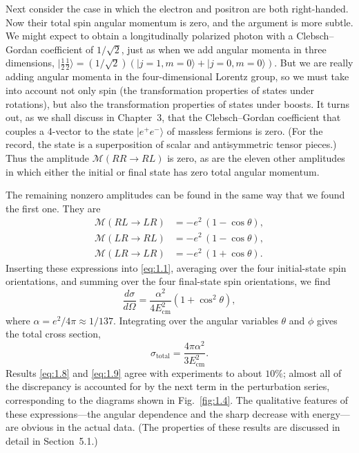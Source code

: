 Next consider the case in which the electron and positron are both
right-handed.  Now their total spin angular momentum is zero, and the
argument is more subtle.  We might expect to obtain a longitudinally
polarized photon with a Clebsch--Gordan coefficient of $1/\sqrt{2}$, just
as when we add angular momenta in three dimensions,
$|\tfrac{1}{2}\tfrac{1}{2}\rangle =
(1/\sqrt{2})(|j{=}1, m{=}0\rangle + |j{=}0, m{=}0\rangle)$.  But we are
really adding angular momenta in the four-dimensional Lorentz group, so
we must take into account not only spin (the transformation properties of
states under rotations), but also the transformation properties of states
under boosts.  It turns out, as we shall discuss in Chapter~3, that the
Clebsch--Gordan coefficient that couples a 4-vector to the state
$|e^{+}e^{-}\rangle$ of massless fermions is zero.  (For the record, the
state is a superposition of scalar and antisymmetric tensor pieces.)  Thus
the amplitude $\mathcal{M}(RR\to RL)$ is zero, as are the eleven other
amplitudes in which either the initial or final state has zero total
angular momentum.

The remaining nonzero amplitudes can be found in the same way that we
found the first one.  They are
\begin{align}
  \mathcal{M}(RL \to LR) &= -e^{2}\,(1 - \cos\theta),\\
  \mathcal{M}(LR \to RL) &= -e^{2}\,(1 - \cos\theta),\\
  \mathcal{M}(LR \to LR) &= -e^{2}\,(1 + \cos\theta).
  \label{eq:1.7}
\end{align}
Inserting these expressions into \eqref{eq:1.1}, averaging over the four
initial-state spin orientations, and summing over the four final-state
spin orientations, we find
\begin{equation}
  \frac{d\sigma}{d\Omega} =
    \frac{\alpha^{2}}{4E_{\mathrm{cm}}^{2}}(1 + \cos^{2}\theta),
  \label{eq:1.8}
\end{equation}
where $\alpha = e^{2}/4\pi \approx 1/137$.  Integrating over the angular
variables $\theta$ and $\phi$ gives the total cross section,
\begin{equation}
  \sigma_{\mathrm{total}} =
    \frac{4\pi\alpha^{2}}{3E_{\mathrm{cm}}^{2}} .
  \label{eq:1.9}
\end{equation}
Results \eqref{eq:1.8} and \eqref{eq:1.9} agree with experiments to about
$10\%$; almost all of the discrepancy is accounted for by the next term in
the perturbation series, corresponding to the diagrams shown in
Fig.~\ref{fig:1.4}.  The qualitative features of these expressions---the
angular dependence and the sharp decrease with energy---are obvious in the
actual data.  (The properties of these results are discussed in detail in
Section~5.1.)

